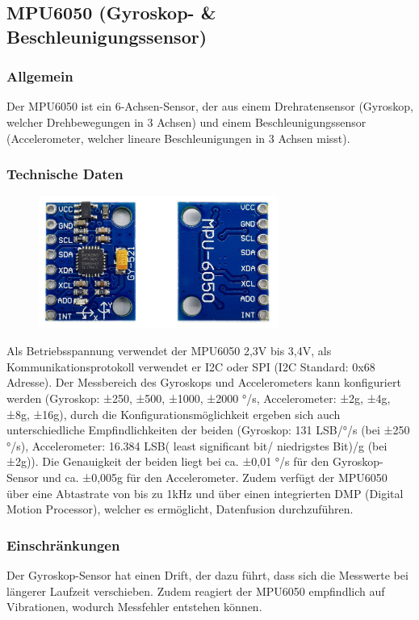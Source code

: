 \subsection{MPU6050 (Gyroskop- \& Beschleunigungssensor)}
%
\subsubsection{Allgemein}
Der MPU6050 ist ein 6-Achsen-Sensor, der aus einem Drehratensensor (Gyroskop, welcher Drehbewegungen in 3 Achsen) und 
einem Beschleunigungssensor (Accelerometer, welcher lineare Beschleunigungen in 3 Achsen misst).
\subsubsection{Technische Daten}
\begin{figure}[H]
    \includegraphics[width=0.7\textwidth, center]{img/Hardware/MPU6050.png}
\end{figure}
Als Betriebsspannung verwendet der MPU6050 2,3V bis 3,4V, als Kommunikationsprotokoll verwendet er I2C oder SPI (I2C Standard: 0x68 Adresse). 
Der Messbereich des Gyroskops und Accelerometers kann konfiguriert werden (Gyroskop:  ±250, ±500, ±1000, ±2000 °/s, Accelerometer: ±2g, ±4g, ±8g, ±16g), 
durch die Konfigurationsmöglichkeit ergeben sich auch unterschiedliche Empfindlichkeiten der beiden (Gyroskop: 131 LSB/°/s (bei ±250 °/s), 
Accelerometer: 16.384 LSB( least significant bit/ niedrigstes Bit)/g (bei ±2g)).  
Die Genauigkeit der beiden liegt bei ca. ±0,01 °/s für den Gyroskop-Sensor und ca. ±0,005g für den Accelerometer. 
Zudem verfügt der MPU6050 über eine Abtastrate von bis zu 1kHz und über einen integrierten DMP (Digital Motion Processor), welcher es ermöglicht, Datenfusion durchzuführen.
\subsubsection{Einschränkungen}
Der Gyroskop-Sensor hat einen Drift, der dazu führt, dass sich die Messwerte bei längerer Laufzeit verschieben. 
Zudem reagiert der MPU6050 empfindlich auf Vibrationen, wodurch Messfehler entstehen können.
%
